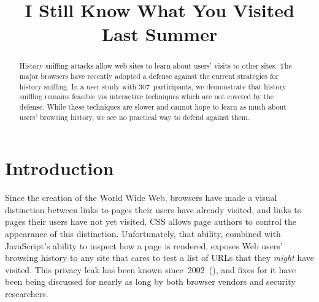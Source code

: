 \documentclass[conference]{IEEEtran}
\newcommand*{\subtitle}[1]{\\\vspace{-0.2em}{\Large\itshape #1}\vspace{0.2em}}
\begin{document}

\title{I Still Know What You Visited Last Summer
\subtitle{Leaking browsing history via user interaction and side
  channel attacks}}
\author{%
%
}
\maketitle

\begin{abstract}
History sniffing attacks allow web sites to learn about users' visits
to other sites.  The major browsers have recently adopted a defense
against the current strategies for history sniffing.  In a user study
with 307~participants, we demonstrate that history sniffing remains
feasible via interactive techniques which are not covered by the
defense.  While these techniques are slower and cannot hope to learn
as much about users' browsing history, we see no practical way to
defend against them.
\end{abstract}

\section{Introduction}\label{sec:intro}

Since the creation of the World Wide Web, browsers have made a visual
distinction between links to pages their users have already visited,
and links to pages their users have not yet visited.  CSS allows page
authors to control the appearance of this distinction. Unfortunately,
that ability, combined with JavaScript's ability to inspect how a page
is rendered, exposes Web users' browsing history to any site that
cares to test a list of URLs that they \emph{might} have visited.
This privacy leak has been known
since~2002~(\cite{bugtraq_visited,moz_visited_bug}), and fixes for it
have been being discussed for nearly as long by both browser vendors
and security researchers.
\end{document}
